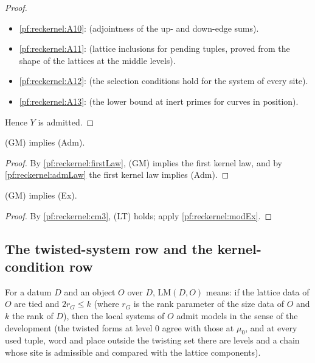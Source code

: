 \begin{proof}
\begin{itemize}
\item \ref{pf:reckernel:A10}:  (adjointness of the up- and down-edge
  sums).
\item \ref{pf:reckernel:A11}:  (lattice
  inclusions for pending tuples, proved from the shape of the lattices at the middle levels).
\item \ref{pf:reckernel:A12}:  (the selection conditions hold for
  the system of every site).
\item \ref{pf:reckernel:A13}:  (the lower bound at inert primes
  for curves in position).
\end{itemize}
Hence $Y$ is admitted.
\end{proof}

\begin{theorem}[Admissibility]\label{pf:reckernel:adm}
\textup{(GM)} implies \textup{(Adm)}.
\end{theorem}

\begin{proof}
By \cref{pf:reckernel:firstLaw}, \textup{(GM)} implies the first kernel law, and by \cref{pf:reckernel:admLaw} the first
kernel law implies \textup{(Adm)}.
\end{proof}

\begin{theorem}\label{pf:reckernel:curveEx}
\textup{(GM)} implies \textup{(Ex)}.
\end{theorem}

\begin{proof}
By \cref{pf:reckernel:cm3}, \textup{(LT)} holds; apply \cref{pf:reckernel:modEx}.
\end{proof}

\subsection{The twisted-system row and the kernel-condition row}\label{pf:reckernel:sec-rows}

\begin{definition}\label{pf:reckernel:def-modelsAt}
For a datum $D$ and an object $O$ over $D$, $\mathrm{LM}(D,O)$ means: if the lattice data of $O$ are tied and
$2r_G\le k$ (where $r_G$ is the rank parameter of the size data of $O$ and $k$ the rank of $D$), then the local systems
of $O$ admit models in the sense of the development (the twisted forms at level $0$ agree with those at $\mu_0$, and at
every used tuple, word and place outside the twisting set there are levels and a chain whose site is admissible and
compared with the lattice components).
\end{definition}

